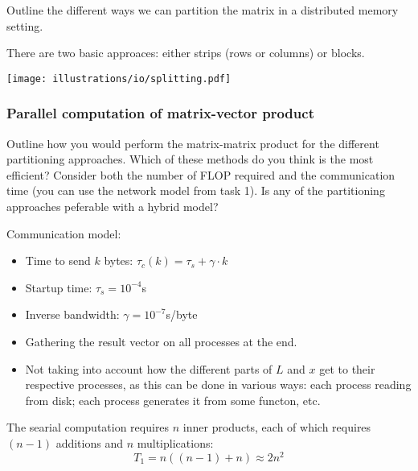 \begin{question}
  Outline the different ways we can partition the matrix in a distributed memory setting.
\end{question}

\noindent There are two basic approaces: either strips (rows or columns) or blocks.

\begin{center}
  \texttt{[image: illustrations/io/splitting.pdf]}
\end{center}


\subsubsection{Parallel computation of matrix-vector product} %
\label{ssub:parallel_computation_of_matrix_vector_product}


\begin{question}
  Outline how you would perform the matrix-matrix product for the different partitioning approaches. Which of these methods do you think is the most efficient? Consider both the number of FLOP required and the communication time (you can use the network model from task 1). Is any of the partitioning approaches peferable with a hybrid model?

  \noindent Communication model:
  \begin{itemize} \itemsep=0em
    \item Time to send $k$ bytes: $\tau_c(k) = \tau_s + \gamma \cdot k$
    \item Startup time: $\tau_s = 10^{-4}$s
    \item Inverse bandwidth: $\gamma = 10^{-7}$s/byte
  \end{itemize}

\end{question}

\begin{itemize}
  \item Gathering the result vector on all processes at the end.
  \item Not taking into account how the different parts of $L$ and $x$ get to their respective processes, as this can be done in various ways: each process reading from disk; each process generates it from some functon, etc.
\end{itemize}

The searial computation requires $n$ inner products, each of which requires $(n-1)$ additions and $n$ multiplications:
\begin{equation}
  T_1 = n((n-1)+n) \approx 2n^2
\end{equation}

